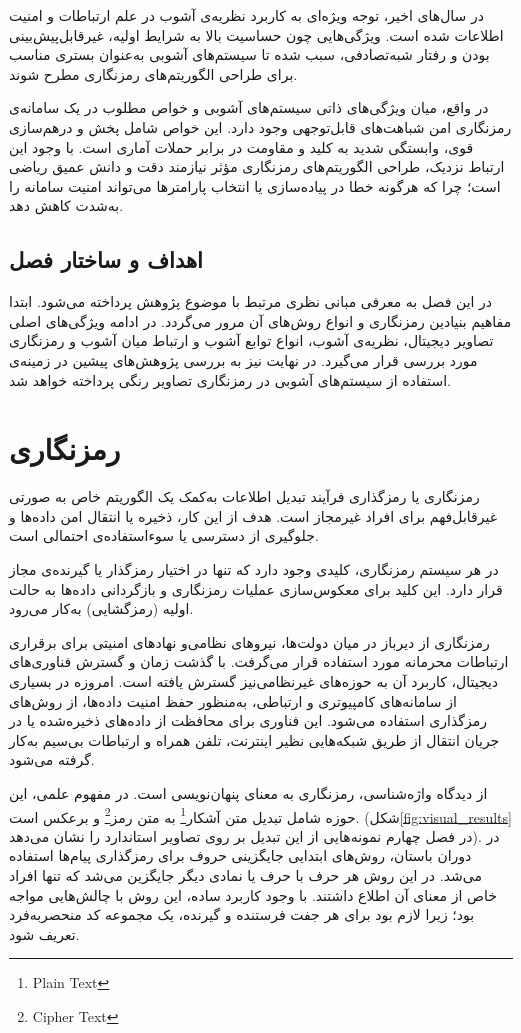 \documentclass[a4paper,12pt]{report}
\renewcommand{\%}{\lr{\oldpercent}}
\providecommand{\LTRfootnote}[1]{\footnote{#1}}
\begin{document}
در سال‌های اخیر، توجه ویژه‌ای به کاربرد نظریه‌ی آشوب در علم ارتباطات و امنیت اطلاعات شده است. ویژگی‌هایی چون حساسیت بالا به شرایط اولیه، غیرقابل‌پیش‌بینی بودن و رفتار شبه‌تصادفی، سبب شده تا سیستم‌های آشوبی به‌عنوان بستری مناسب برای طراحی الگوریتم‌های رمزنگاری مطرح شوند.

در واقع، میان ویژگی‌های ذاتی سیستم‌های آشوبی و خواص مطلوب در یک سامانه‌ی رمزنگاری امن شباهت‌های قابل‌توجهی وجود دارد. این خواص شامل پخش و درهم‌سازی قوی، وابستگی شدید به کلید و مقاومت در برابر حملات آماری است. با وجود این ارتباط نزدیک، طراحی الگوریتم‌های رمزنگاری مؤثر نیازمند دقت و دانش عمیق ریاضی است؛ چرا که هرگونه خطا در پیاده‌سازی یا انتخاب پارامترها می‌تواند امنیت سامانه را به‌شدت کاهش دهد.

\subsection{اهداف و ساختار فصل}
در این فصل به معرفی مبانی نظری مرتبط با موضوع پژوهش پرداخته می‌شود. ابتدا مفاهیم بنیادین رمزنگاری و انواع روش‌های آن مرور می‌گردد. در ادامه ویژگی‌های اصلی تصاویر دیجیتال، نظریه‌ی آشوب، انواع توابع آشوب و ارتباط میان آشوب و رمزنگاری مورد بررسی قرار می‌گیرد. در نهایت نیز به بررسی پژوهش‌های پیشین در زمینه‌ی استفاده از سیستم‌های آشوبی در رمزنگاری تصاویر رنگی پرداخته خواهد شد.


\section{رمزنگاری}
رمزنگاری یا رمزگذاری فرآیند تبدیل اطلاعات به‌کمک یک الگوریتم خاص به صورتی غیرقابل‌فهم برای افراد غیرمجاز است. هدف از این کار، ذخیره یا انتقال امن داده‌ها و جلوگیری از دسترسی یا سوء‌استفاده‌ی احتمالی است. 

در هر سیستم رمزنگاری، کلیدی وجود دارد که تنها در اختیار رمزگذار یا گیرنده‌ی مجاز قرار دارد. این کلید برای معکوس‌سازی عملیات رمزنگاری و بازگردانی داده‌ها به حالت اولیه (رمزگشایی) به‌کار می‌رود.

رمزنگاری از دیرباز در میان دولت‌ها، نیروهای نظامی‌و نهادهای امنیتی برای برقراری ارتباطات محرمانه مورد استفاده قرار می‌گرفت. با گذشت زمان و گسترش فناوری‌های دیجیتال، کاربرد آن به حوزه‌های غیرنظامی‌نیز گسترش یافته است. امروزه در بسیاری از سامانه‌های کامپیوتری و ارتباطی، به‌منظور حفظ امنیت داده‌ها، از روش‌های رمزگذاری استفاده می‌شود. این فناوری برای محافظت از داده‌های ذخیره‌شده یا در جریان انتقال از طریق شبکه‌هایی نظیر اینترنت، تلفن همراه و ارتباطات بی‌سیم به‌کار گرفته می‌شود\cite{ref14}.

از دیدگاه واژه‌شناسی، رمزنگاری به معنای پنهان‌نویسی است. در مفهوم علمی، این حوزه شامل تبدیل متن آشکار\LTRfootnote{Plain Text} به متن رمز\LTRfootnote{Cipher Text} و برعکس است. (شکل\ref{fig:visual_results} در فصل چهارم نمونه‌هایی از این تبدیل بر روی تصاویر استاندارد را نشان می‌دهد). در دوران باستان، روش‌های ابتدایی جایگزینی حروف برای رمزگذاری پیام‌ها استفاده می‌شد. در این روش هر حرف با حرف یا نمادی دیگر جایگزین می‌شد که تنها افراد خاص از معنای آن اطلاع داشتند. با وجود کاربرد ساده، این روش با چالش‌هایی مواجه بود؛ زیرا لازم بود برای هر جفت فرستنده و گیرنده، یک مجموعه کد منحصربه‌فرد تعریف شود\cite{ref15}.
\end{document}
